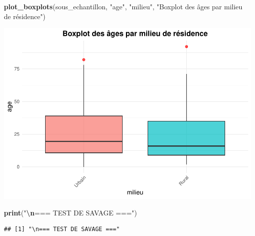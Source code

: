 \documentclass[
  12pt,
]{article}
\newenvironment{Shaded}{\begin{snugshade}}{\end{snugshade}}
\newcommand{\AttributeTok}[1]{\textcolor[rgb]{0.13,0.29,0.53}{#1}}
\newcommand{\FloatTok}[1]{\textcolor[rgb]{0.00,0.00,0.81}{#1}}
\newcommand{\FunctionTok}[1]{\textcolor[rgb]{0.13,0.29,0.53}{\textbf{#1}}}
\newcommand{\NormalTok}[1]{#1}
\newcommand{\OtherTok}[1]{\textcolor[rgb]{0.56,0.35,0.01}{#1}}
\newcommand{\SpecialCharTok}[1]{\textcolor[rgb]{0.81,0.36,0.00}{\textbf{#1}}}
\newcommand{\StringTok}[1]{\textcolor[rgb]{0.31,0.60,0.02}{#1}}
\begin{document}
\begin{Shaded}
\begin{Highlighting}[]
\FunctionTok{plot\_boxplots}\NormalTok{(sous\_echantillon, }\StringTok{"age"}\NormalTok{, }\StringTok{"milieu"}\NormalTok{, }\StringTok{"Boxplot des âges par milieu de résidence"}\NormalTok{)}
\end{Highlighting}
\end{Shaded}

\includegraphics{Stat_non_para_files/figure-latex/unnamed-chunk-102-1.pdf}

\begin{Shaded}
\begin{Highlighting}[]
\FunctionTok{print}\NormalTok{(}\StringTok{"}\SpecialCharTok{\textbackslash{}n}\StringTok{=== TEST DE SAVAGE ==="}\NormalTok{)}
\end{Highlighting}
\end{Shaded}

\begin{verbatim}
## [1] "\n=== TEST DE SAVAGE ==="
\end{verbatim}

\begin{Shaded}
\end{Shaded}
\end{document}
